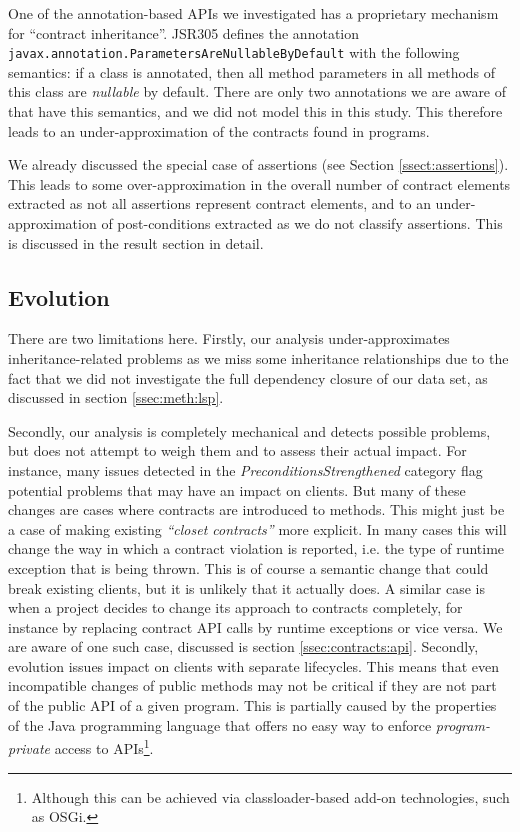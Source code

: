 \documentclass[a4paper,UKenglish]{lipics-v2016}
\begin{document}
One of the annotation-based APIs we investigated has a proprietary mechanism for ``contract inheritance''. JSR305 \cite{JSR305} defines the annotation \texttt{javax.anno\-tation.Para\-meters\-Are\-Null\-able\-By\-Default} with the following semantics: if a class is annotated, then all method parameters in all methods of this class are \textit{nullable} by default.  There are only two annotations we are aware of that have this semantics, and we did not model this in this study. This therefore leads to an under-approximation of the contracts found in programs. 

We already discussed the special case of assertions (see Section \ref{ssect:assertions}). This leads to some over-approximation in the overall number of contract elements extracted as not all assertions represent contract elements, and to an under-approximation of post-conditions extracted as we do not classify assertions. This is discussed in the result section in detail.

\subsection{Evolution}

There are two limitations here. Firstly, our analysis under-approximates inheritance-related problems as we miss some inheritance relationships due to the fact that we did not investigate the full dependency closure of our data set, as discussed in section \ref{ssec:meth:lsp}. 

Secondly, our analysis is completely mechanical and detects possible problems, but does not attempt to weigh them and to assess their actual impact. For instance, many issues detected in the  \textit{PreconditionsStrengthened} category flag potential problems that may have an impact on clients. But many of these changes are cases where contracts are introduced to methods. This might just be a case of making existing \textit{``closet contracts''} \cite{AM02} more explicit. In many cases this will change the way in which a contract violation is reported, i.e. the type of runtime exception that is being thrown. This is of course a semantic change that could break existing clients, but it is unlikely that it actually does. A similar case is when a project decides to change its approach to contracts completely, for instance by replacing contract API calls by runtime exceptions or vice versa. We are aware of one such case, discussed is section \ref{ssec:contracts:api}. 
Secondly, evolution issues impact on clients with separate lifecycles. This means that even incompatible changes of public methods may not be critical if they are not part of the public API of a given program. This is partially caused by the properties of the Java programming language that offers no easy way to enforce \textit{program-private} access to APIs\footnote{Although this can be achieved via classloader-based add-on technologies, such as OSGi.}. 
\end{document}

